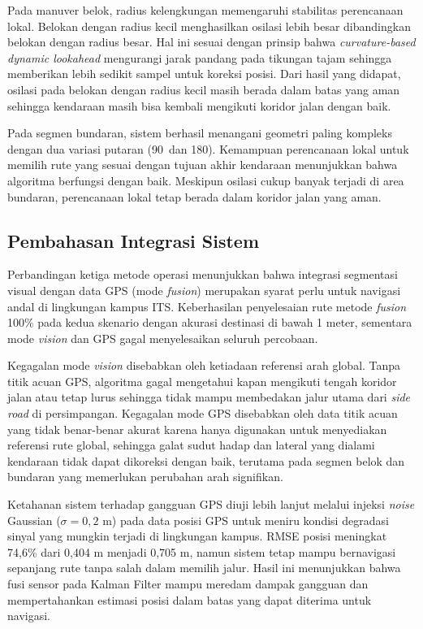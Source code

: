 Pada manuver belok, radius kelengkungan memengaruhi stabilitas perencanaan lokal.
Belokan dengan radius kecil menghasilkan osilasi lebih besar dibandingkan belokan dengan radius besar.
Hal ini sesuai dengan prinsip bahwa \emph{curvature-based dynamic lookahead} mengurangi jarak pandang pada tikungan tajam sehingga memberikan lebih sedikit sampel untuk koreksi posisi.
Dari hasil yang didapat, osilasi pada belokan dengan radius kecil masih berada dalam batas yang aman sehingga kendaraan masih bisa kembali mengikuti koridor jalan dengan baik.

Pada segmen bundaran, sistem berhasil menangani geometri paling kompleks dengan dua variasi putaran (90\textdegree\ dan 180\textdegree).
Kemampuan perencanaan lokal untuk memilih rute yang sesuai dengan tujuan akhir kendaraan menunjukkan bahwa algoritma berfungsi dengan baik.
Meskipun osilasi cukup banyak terjadi di area bundaran, perencanaan lokal tetap berada dalam koridor jalan yang aman.

\subsection{Pembahasan Integrasi Sistem}
\label{sec:bahas_integrasi}

Perbandingan ketiga metode operasi menunjukkan bahwa integrasi segmentasi visual dengan data GPS (mode \emph{fusion}) merupakan syarat perlu untuk navigasi andal di lingkungan kampus ITS.
Keberhasilan penyelesaian rute metode \emph{fusion} 100\% pada kedua skenario dengan akurasi destinasi di bawah 1 meter, sementara mode \emph{vision} dan GPS gagal menyelesaikan seluruh percobaan.

Kegagalan mode \emph{vision} disebabkan oleh ketiadaan referensi arah global.
Tanpa titik acuan GPS, algoritma gagal mengetahui kapan mengikuti tengah koridor jalan atau tetap lurus sehingga tidak mampu membedakan jalur utama dari \emph{side road} di persimpangan.
Kegagalan mode GPS disebabkan oleh data titik acuan yang tidak benar-benar akurat karena hanya digunakan untuk menyediakan referensi rute global, sehingga galat sudut hadap dan lateral yang dialami kendaraan tidak dapat dikoreksi dengan baik, terutama pada segmen belok dan bundaran yang memerlukan perubahan arah signifikan.

Ketahanan sistem terhadap gangguan GPS diuji lebih lanjut melalui injeksi \emph{noise} Gaussian ($\sigma = 0,2$ m) pada data posisi GPS untuk meniru kondisi degradasi sinyal yang mungkin terjadi di lingkungan kampus.
RMSE posisi meningkat 74,6\% dari 0,404 m menjadi 0,705 m, namun sistem tetap mampu bernavigasi sepanjang rute tanpa salah dalam memilih jalur.
Hasil ini menunjukkan bahwa fusi sensor pada Kalman Filter mampu meredam dampak gangguan dan mempertahankan estimasi posisi dalam batas yang dapat diterima untuk navigasi.

